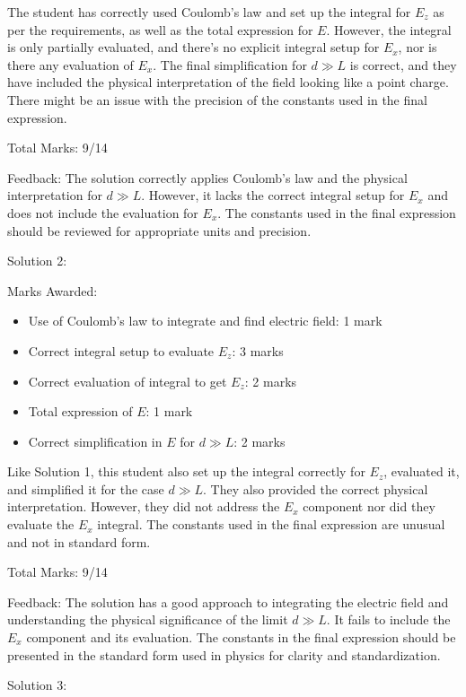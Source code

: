 \documentclass[a4paper,11pt]{article}
\begin{document}
The student has correctly used Coulomb's law and set up the integral for \( E_z \) as per the requirements, as well as the total expression for \( E \). However, the integral is only partially evaluated, and there's no explicit integral setup for \( E_x \), nor is there any evaluation of \( E_x \). The final simplification for \( d \gg L \) is correct, and they have included the physical interpretation of the field looking like a point charge. There might be an issue with the precision of the constants used in the final expression.

Total Marks: 9/14

Feedback:
The solution correctly applies Coulomb's law and the physical interpretation for \( d \gg L \). However, it lacks the correct integral setup for \( E_x \) and does not include the evaluation for \( E_x \). The constants used in the final expression should be reviewed for appropriate units and precision. 

Solution 2:

Marks Awarded:
\begin{itemize}
  \item Use of Coulomb's law to integrate and find electric field: 1 mark
  \item Correct integral setup to evaluate \( E_z \): 3 marks
  \item Correct evaluation of integral to get \( E_z \): 2 marks
  \item Total expression of \( E \): 1 mark
  \item Correct simplification in \( E \) for \( d \gg L \): 2 marks
\end{itemize}

Like Solution 1, this student also set up the integral correctly for \( E_z \), evaluated it, and simplified it for the case \( d \gg L \). They also provided the correct physical interpretation. However, they did not address the \( E_x \) component nor did they evaluate the \( E_x \) integral. The constants used in the final expression are unusual and not in standard form.

Total Marks: 9/14

Feedback:
The solution has a good approach to integrating the electric field and understanding the physical significance of the limit \( d \gg L \). It fails to include the \( E_x \) component and its evaluation. The constants in the final expression should be presented in the standard form used in physics for clarity and standardization.

Solution 3:
\end{document}
